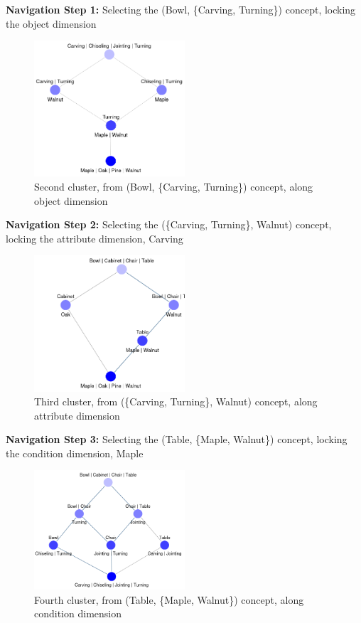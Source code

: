 \documentclass{article}
\begin{document}
\newpage
\textbf{Navigation Step 1:} Selecting the (Bowl, \{Carving, Turning\}) concept, locking the object dimension

\begin{figure}[htbp]
  \centering
  \includegraphics[width=0.5\textwidth]{cluster_1.png}
  \caption{Second cluster, from (Bowl, \{Carving, Turning\}) concept, along object dimension}
  \label{fig:cluster_1}
\end{figure}

\textbf{Navigation Step 2:} Selecting the (\{Carving, Turning\}, Walnut) concept, locking the attribute dimension, Carving

\begin{figure}[htbp]
  \centering
  \includegraphics[width=0.5\textwidth]{cluster_2.png}
  \caption{Third cluster, from (\{Carving, Turning\}, Walnut) concept, along attribute dimension}
  \label{fig:cluster_2}
\end{figure}

\newpage
\textbf{Navigation Step 3:} Selecting the (Table, \{Maple, Walnut\}) concept, locking the condition dimension, Maple

\begin{figure}[htbp]
  \centering
  \includegraphics[width=0.5\textwidth]{cluster_3.png}
  \caption{Fourth cluster, from (Table, \{Maple, Walnut\}) concept, along condition dimension}
  \label{fig:cluster_3}
\end{figure}
\end{document}
